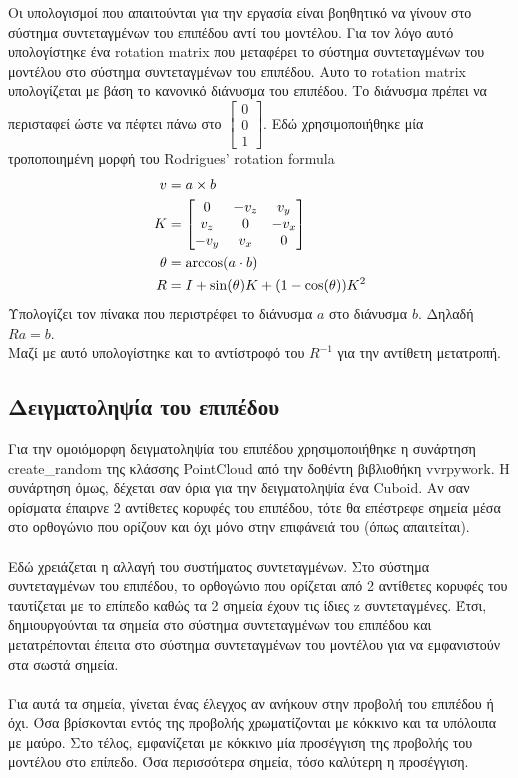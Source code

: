 \documentclass{report}
\begin{document}
Οι υπολογισμοί που απαιτούνται για την εργασία είναι βοηθητικό να γίνουν στο σύστημα συντεταγμένων του επιπέδου αντί του μοντέλου.
Για τον λόγο αυτό υπολογίστηκε ένα rotation matrix που μεταφέρει το σύστημα συντεταγμένων του μοντέλου στο σύστημα συντεταγμένων του επιπέδου.
Αυτο το rotation matrix υπολογίζεται με βάση το κανονικό διάνυσμα του επιπέδου. Το διάνυσμα πρέπει να περισταφεί ώστε να
πέφτει πάνω στο $\begin{bmatrix}0 \\ 0 \\ 1\end{bmatrix}$. Εδώ χρησιμοποιήθηκε μία τροποποιημένη μορφή του Rodrigues' rotation formula
\cite{rodrigues-rotation-formula}
\begin{align}
    v &= a \times b \notag \\
    K &= \begin{bmatrix}
        0 & -v_z & v_y \\
        v_z & 0 & -v_x \\
        -v_y & v_x & 0
    \end{bmatrix} \notag \\
    \theta &= \arccos(a \cdot b) \notag \\
    R &= I + \sin(\theta)K + (1 - \cos(\theta))K^2
\end{align}
Υπολογίζει τον πίνακα που περιστρέφει το διάνυσμα $a$ στο διάνυσμα $b$. Δηλαδή $Ra = b$. \\
Μαζί με αυτό υπολογίστηκε και το αντίστροφό του $R^{-1}$ για την αντίθετη μετατροπή.

\subsection{Δειγματοληψία του επιπέδου}
Για την ομοιόμορφη δειγματοληψία του επιπέδου χρησιμοποιήθηκε η συνάρτηση create\_random της κλάσσης PointCloud από
την δοθέντη βιβλιοθήκη vvrpywork. Η συνάρτηση όμως, δέχεται σαν όρια για την δειγματοληψία ένα Cuboid. Αν σαν ορίσματα έπαιρνε 2 αντίθετες
κορυφές του επιπέδου, τότε θα επέστρεφε σημεία μέσα στο ορθογώνιο που ορίζουν και όχι μόνο στην επιφάνειά του (όπως απαιτείται).
\\\\
Εδώ χρειάζεται η αλλαγή του συστήματος συντεταγμένων. Στο σύστημα συντεταγμένων του επιπέδου, το ορθογώνιο που ορίζεται από 2 αντίθετες
κορυφές του ταυτίζεται με το επίπεδο καθώς τα 2 σημεία έχουν τις ίδιες z συντεταγμένες. Έτσι, δημιουργούνται τα σημεία στο σύστημα συντεταγμένων
του επιπέδου και μετατρέπονται έπειτα στο σύστημα συντεταγμένων του μοντέλου για να εμφανιστούν στα σωστά σημεία.
\\\\
Για αυτά τα σημεία, γίνεται ένας έλεγχος αν ανήκουν στην προβολή του επιπέδου ή όχι. Όσα βρίσκονται εντός της προβολής χρωματίζονται με
κόκκινο και τα υπόλοιπα με μαύρο. Στο τέλος, εμφανίζεται με κόκκινο μία προσέγγιση της προβολής του μοντέλου στο επίπεδο. Όσα περισσότερα
σημεία, τόσο καλύτερη η προσέγγιση.
\end{document}
